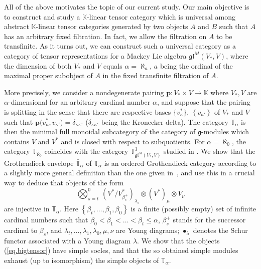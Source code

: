 \documentclass[11pt]{article}
\theoremstyle{plain}
\theoremstyle{nonumberplain}
\theoremstyle{plain}
\theoremstyle{nonumberplain}
\newcommand\bK{\mathbb K}
\newcommand\bT{\mathbb T}
\newcommand\fg{\mathfrak{g}}
\newcommand\fgl{\mathfrak{gl}}
\begin{document}
All of the above motivates the topic of our current study.  Our main
objective is to construct and study a
$\mathbb{K}$-linear tensor category which is universal among
abstract $\mathbb{K}$-linear tensor categories generated by two objects $A$ and $B$ such
that $A$ has an arbitrary fixed filtration.  In fact, we allow the
filtration on $A$ to be transfinite.  As it turns out, we can
construct such a universal category as a category of tensor
representations for a Mackey Lie algebra $\fgl^M(V_*,V)$, where the
dimension of both $V_*$ and $V$ equals $\alpha=\aleph_{a}$, $a$ being
the ordinal of the maximal proper subobject of $A$ in the fixed
transfinite filtration of $A$.

More precisely, we consider a nondegenerate pairing $\mathbf{p}:V_*\times V\to\bK$ where
$V_*,V$ are $\alpha$-dimensional for an arbitrary cardinal number $\alpha$, and suppose that the pairing is splitting in the sense that there are respective bases
$\big\{v^*_\kappa\big\}$, $\left\{v_{\kappa'}\right\}$ of $V_*$ and $V$ such that
$\mathbf{p}\big(v^*_\kappa,v_{\kappa'}\big)=\delta_{\kappa\kappa'}$
($\delta_{\kappa\kappa'}$ being the Kronecker delta).  The category $\bT_\alpha$ is then the minimal full monoidal subcategory of the
category of $\fg$-modules which contains $V$ and $V^*$ and is
closed with respect to subquotients.  For $\alpha=\aleph_0$, the
category $\bT_{\aleph_0}$ coincides with the category
$\bT^3_{\fgl^M(V_*,V)}$ studied in \cite{us2}.   We show that the Grothendieck envelope $\bar{\bT}_{\alpha}$ of $\bT_\alpha$
is an ordered Grothendieck category according to a slightly more general definition than the one given in~\cite{us2}, and use this in a crucial way
to deduce that objects of the form
\begin{equation}
	\bigotimes_{s=t}^0\,\left(V^*/V^*_{\beta^+_s}\right)_{\lambda_s}\otimes \left(V^*\right)_\mu\otimes V_\nu
	\label{eq.bigtensor}
\end{equation}
are injective in $\bT_\alpha$.  Here $\left\{\beta_t,\ldots,\beta_1,\beta_0\right\}$ is a finite (possibly empty) set of infinite cardinal
numbers such that $\beta_0<\beta_1<\ldots<\beta_t\leq \alpha$, $\beta_s^+$ stands for the successor cardinal
to $\beta_s$, and $\lambda_t,\ldots,\lambda_1,\lambda_0,\mu,\nu$ are
Young diagrams; $\bullet_\lambda$ denotes the Schur
functor associated with a Young diagram $\lambda$.  We show that the objects (\ref{eq.bigtensor}) have simple socles, and that the so obtained  simple modules exhaust (up to isomorphism) the simple objects of $\bT_\alpha$.  
\end{document}
